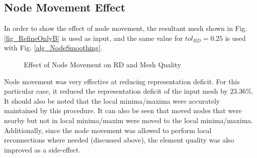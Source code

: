 \subsection{Node Movement Effect}
In order to show the effect of node movement, the resultant mesh shown
in Fig. \ref{fig_RefineOnlyB} is used as input, and the same value for
$tol_{RD} = 0.25$ is used with Fig. \ref{alg_NodeSmoothing}.

\begin{figure}[h!]
  \begin{center}
 
  \caption{Effect of Node Movement on RD and Mesh Quality}
  \label{fig_NodeSmoothing}

  \end{center}
\end{figure}

Node movement was very effective at reducing representation deficit.
For this particular case, it reduced the representation deficit of the
input mesh by $23.36\%$. It should also be noted that the local
minima/maxima were accurately maintained by this procedure. It can also
be seen that moved nodes that were nearby but not in local minima/maxim
were moved to the local minima/maxima.  Additionally, since the node
movement was allowed to perform local reconnections where needed
(discussed above), the element quality was also improved as a
side-effect.

